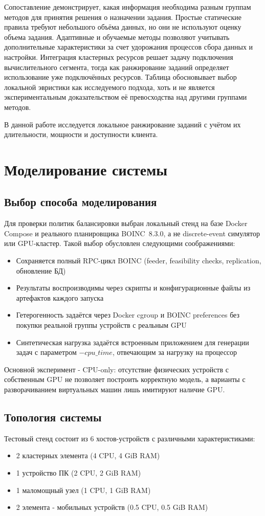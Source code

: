 \documentclass[a4paper,12pt]{extarticle}
\begin{document}
Сопоставление демонстрирует, какая информация необходима разным группам методов для принятия решения о назначении задания. Простые статические правила требуют небольшого объёма данных, но они не используют оценку объема задания. Адаптивные и обучаемые методы позволяют учитывать дополнительные характеристики за счет удорожания процессов сбора данных и настройки. Интеграция кластерных ресурсов решает задачу подключения вычислительного сегмента, тогда как ранжирование заданий определяет использование уже подключённых ресурсов. Таблица обосновывает выбор локальной эвристики как исследуемого подхода, хоть и не является экспериментальным доказательством её превосходства над другими группами методов.

В данной работе исследуется локальное ранжирование заданий с учётом их длительности, мощности и доступности клиента.

\newpage
\section{Моделирование системы}

\subsection{Выбор способа моделирования}

Для проверки политик балансировки выбран локальный стенд на базе Docker Compose и реального планировщика BOINC~8.3.0, а не discrete-event симулятор или GPU-кластер. Такой выбор обусловлен следующими соображениями:
\begin{itemize}
    \item Сохраняется полный RPC-цикл BOINC (feeder, feasibility checks, replication, обновление БД)
    \item Результаты воспроизводимы через скрипты и конфигурационные файлы из артефактов каждого запуска
    \item Гетерогенность задаётся через Docker cgroup и BOINC preferences без покупки реальной группы устройств с реальным GPU
    \item Синтетическая нагрузка задаётся встроенным приложением для генерации задач с параметром $-cpu\_time$, отвечающим за нагрузку на процессор
\end{itemize}
Основной эксперимент - CPU-only: отсутствие физических устройств с собственным GPU не позволяет построить корректную модель, а варианты с разворачиванием виртуальных машин лишь имитируют наличие GPU.

\subsection{Топология системы}
Тестовый стенд состоит из 6 хостов-устройств с различными характеристиками:
\begin{itemize}
    \item 2 кластерных элемента (4 CPU, 4 GiB RAM)
    \item 1 устройство ПК (2 CPU, 2 GiB RAM)
    \item 1 маломощный узел (1 CPU, 1 GiB RAM)
    \item 2 элемента - мобильных устройств (0.5 CPU, 0.5 GiB RAM)
\end{itemize}
\end{document}
